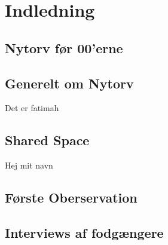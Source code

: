 \chapter{Indledning}
\label{chap:Indledning}

\section{Nytorv før 00'erne}
\label{sec:Nytorv før 00'erne}

\section{Generelt om Nytorv}
\label{sec:Generelt om Nytorv}
Det er fatimah
\section{Shared Space}
\label{sec:Shared Space}
Hej mit navn \cite {datasheet_pir1}
\section{Første Oberservation}
\label{sec:Første Oberservation}

\section{Interviews af fodgængere}
\label{sec:Interviews af fodgængere}
